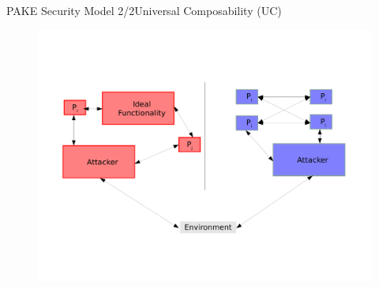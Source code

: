 \documentclass[notes,xcolor=dvipsnames]{beamer}
\begin{document}
\begin{frame}{PAKE Security Model 2/2}{Universal Composability (UC)}
  \begin{figure}
  \centering
  \includegraphics[width=\textwidth]{uc.pdf}
  \end{figure}
\end{frame}

%
%
\end{document}
